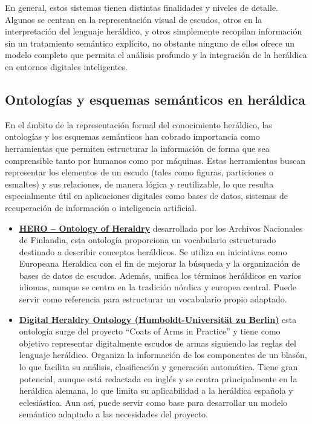 En general, estos sistemas tienen distintas finalidades y niveles de detalle. Algunos se centran
en la representación visual de escudos, otros en la interpretación del lenguaje heráldico, y
otros simplemente recopilan información sin un tratamiento semántico explícito, no obstante ninguno
de ellos ofrece un modelo completo que permita el análisis profundo y la integración de la 
heráldica en entornos digitales inteligentes.

\subsection{Ontologías y esquemas semánticos en heráldica}
En el ámbito de la representación formal del conocimiento heráldico, las ontologías y los esquemas 
semánticos han cobrado importancia como herramientas que permiten estructurar la información de
forma que sea comprensible tanto por humanos como por máquinas. Estas herramientas buscan representar
los elementos de un escudo (tales como figuras, particiones o esmaltes) y sus relaciones, de manera
lógica y reutilizable, lo que resulta especialmente útil en aplicaciones digitales como bases de 
datos, sistemas de recuperación de información o inteligencia artificial.

\begin{itemize}
    \item \textbf{\href{https://finto.fi/en/ontology/heraldica/}{HERO – Ontology of Heraldry}} desarrollada por los Archivos Nacionales de Finlandia, 
    esta ontología proporciona un vocabulario estructurado destinado a describir conceptos heráldicos.
    Se utiliza en iniciativas como Europeana Heraldica con el fin de mejorar la búsqueda y la organización
    de bases de datos de escudos. Además, unifica los términos heráldicos en varios idiomas, aunque se
    centra en la tradición nórdica y europea central. Puede servir como referencia para estructurar un
    vocabulario propio adaptado.
    \item \textbf{\href{https://digitalheraldry.org/digital-heraldry-ontology/heraldry/documentation/index-en.html}{Digital Heraldry Ontology (Humboldt-Universität zu Berlin)}} esta ontología surge del
    proyecto “Coats of Arms in Practice” y tiene como objetivo representar digitalmente escudos de armas
    siguiendo las reglas del lenguaje heráldico. Organiza la información de los componentes de un blasón,
    lo que facilita su análisis, clasificación y generación automática. Tiene gran potencial, aunque está
    redactada en inglés y se centra principalmente en la heráldica alemana, lo que limita su aplicabilidad
    a la heráldica española y eclesiástica. Aun así, puede servir como base para desarrollar un modelo
    semántico adaptado a las necesidades del proyecto.
\end{itemize}

